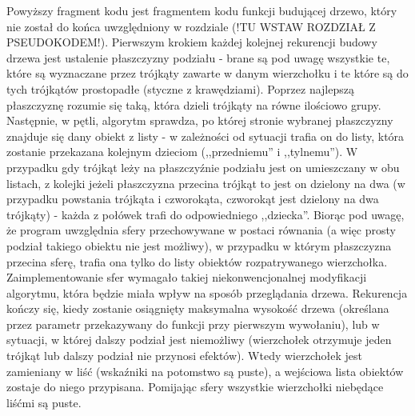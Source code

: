 Powyższy fragment kodu jest fragmentem kodu funkcji budującej drzewo, który nie został do końca uwzględniony w rozdziale (!TU WSTAW ROZDZIAŁ Z PSEUDOKODEM!). Pierwszym krokiem każdej kolejnej rekurencji budowy drzewa jest ustalenie płaszczyzny podziału - brane są pod uwagę wszystkie te, które są wyznaczane przez trójkąty zawarte w danym wierzchołku i te które są do tych trójkątów prostopadłe (styczne z krawędziami). Poprzez najlepszą płaszczyznę rozumie się taką, która dzieli trójkąty na równe ilościowo grupy. Następnie, w pętli, algorytm sprawdza, po której stronie wybranej płaszczyzny znajduje się dany obiekt z listy - w zależności od sytuacji trafia on do listy, która zostanie przekazana kolejnym dzieciom (,,przedniemu'' i ,,tylnemu''). W przypadku gdy trójkąt leży na płaszczyźnie podziału jest on umieszczany w obu listach, z kolejki jeżeli płaszczyzna przecina trójkąt to jest on dzielony na dwa (w przypadku powstania trójkąta i czworokąta, czworokąt jest dzielony na dwa trójkąty) - każda z połówek trafi do odpowiedniego ,,dziecka''. Biorąc pod uwagę, że program uwzględnia sfery przechowywane w postaci równania (a więc prosty podział takiego obiektu nie jest możliwy), w przypadku w którym płaszczyzna przecina sferę, trafia ona tylko do listy obiektów rozpatrywanego wierzchołka. Zaimplementowanie sfer wymagało takiej niekonwencjonalnej modyfikacji algorytmu, która będzie miała wpływ na sposób przeglądania drzewa. Rekurencja kończy się, kiedy zostanie osiągnięty maksymalna wysokość drzewa (określana przez parametr przekazywany do funkcji przy pierwszym wywołaniu), lub w sytuacji, w której dalszy podział jest niemożliwy (wierzchołek otrzymuje jeden trójkąt lub dalszy podział nie przynosi efektów). Wtedy wierzchołek jest zamieniany w liść (wskaźniki na potomstwo są puste), a wejściowa lista obiektów zostaje do niego przypisana. Pomijając sfery wszystkie wierzchołki niebędące liśćmi są puste.

